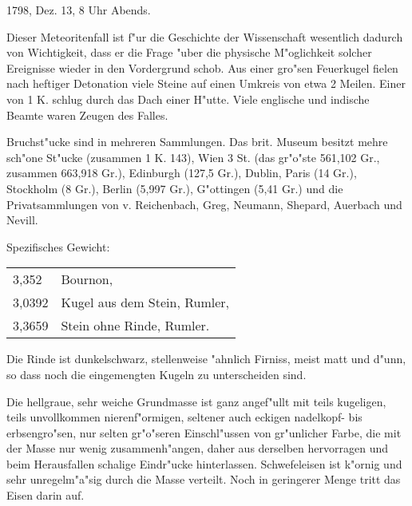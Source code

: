 \documentclass[a4paper, 11pt, oneside]{article}
\begin{document}
1798, Dez. 13, 8 Uhr Abends.

Dieser Meteoritenfall ist f"ur die Geschichte der Wissenschaft wesentlich dadurch von Wichtigkeit, dass er die Frage "uber die physische M"oglichkeit solcher Ereignisse wieder in den Vordergrund schob. Aus einer gro"sen Feuerkugel fielen nach heftiger Detonation viele Steine auf einen Umkreis von etwa 2 Meilen. Einer von 1 K. schlug durch das Dach einer H"utte. Viele englische und indische Beamte waren Zeugen des Falles.

Bruchst"ucke sind in mehreren Sammlungen. Das brit. Museum besitzt mehre sch"one St"ucke (zusammen 1 K. 143), Wien 3 St. (das gr"o"ste 561,102 Gr., zusammen 663,918 Gr.), Edinburgh (127,5 Gr.), Dublin, Paris (14 Gr.), Stockholm (8 Gr.), Berlin (5,997 Gr.), G"ottingen (5,41 Gr.) und die Privatsammlungen von v. Reichenbach, Greg, Neumann, Shepard, Auerbach und Nevill.

Spezifisches Gewicht:
\begin{table}[!ht]
    \centering\swabfamily\Large
    \begin{tabular}{l l}
        3,352 & Bournon,\\
        3,0392 & Kugel aus dem Stein, Rumler,\\
        3,3659 & Stein ohne Rinde, Rumler.
    \end{tabular}
\end{table}

Die Rinde ist dunkelschwarz, stellenweise "ahnlich Firniss, meist matt und d"unn, so dass noch die eingemengten Kugeln zu unterscheiden sind.

Die hellgraue, sehr weiche Grundmasse ist ganz angef"ullt mit teils kugeligen, teils unvollkommen nierenf"ormigen, seltener auch eckigen nadelkopf- bis erbsengro"sen, nur selten gr"o"seren Einschl"ussen von gr"unlicher Farbe, die mit der Masse nur wenig zusammenh"angen, daher aus derselben hervorragen und beim Herausfallen schalige Eindr"ucke hinterlassen. Schwefeleisen ist k"ornig und sehr unregelm"a"sig durch die Masse verteilt. Noch in geringerer Menge tritt das Eisen darin auf.
\end{document}
